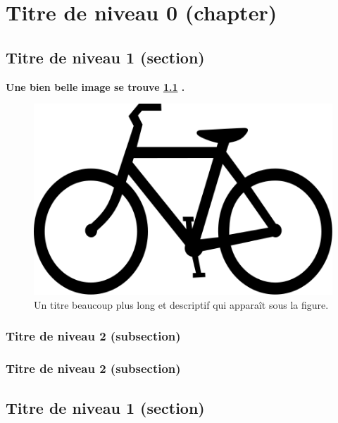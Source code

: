 \chapter{Titre de niveau 0 (chapter)}
\thispagestyle{plainStarred}


\blindtext


\section{Titre de niveau 1 (section)}
\blindtext

\textbf{Une bien belle image se trouve \cref{fig51} .}

\begin{figure}
\begin{center}
	\includegraphics{figures/appendix/figure_51.png}
	\caption[Titre court table des matières]{Un titre beaucoup plus long et descriptif qui apparaît sous la figure.}
	\label{fig51}
\end{center}
\end{figure}

	\subsection{Titre de niveau 2 (subsection)}
\blindtext

	\subsection{Titre de niveau 2 (subsection)}
\blindtext


\section{Titre de niveau 1 (section)}
\blindtext


\clearpage
\thispagestyle{empty}